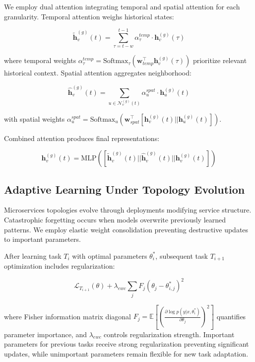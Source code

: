 We employ dual attention integrating temporal and spatial attention for each granularity. Temporal attention weighs historical states:

\begin{equation}
\tilde{\mathbf{h}}_v^{(g)}(t) = \sum_{\tau=t-w}^{t-1} \alpha_\tau^{temp} \cdot \mathbf{h}_v^{(g)}(\tau)
\end{equation}

where temporal weights $\alpha_\tau^{temp} = \text{Softmax}_\tau(\mathbf{w}_{temp}^\top \mathbf{h}_v^{(g)}(\tau))$ prioritize relevant historical context. Spatial attention aggregates neighborhood:

\begin{equation}
\hat{\mathbf{h}}_v^{(g)}(t) = \sum_{u \in \mathcal{N}_v^{(g)}(t)} \alpha_u^{spat} \cdot \mathbf{h}_u^{(g)}(t)
\end{equation}

with spatial weights $\alpha_u^{spat} = \text{Softmax}_u(\mathbf{w}_{spat}^\top [\mathbf{h}_v^{(g)}(t) || \mathbf{h}_u^{(g)}(t)])$.

Combined attention produces final representations:

\begin{equation}
\mathbf{h}_v^{(g)}(t) = \text{MLP}\left([\tilde{\mathbf{h}}_v^{(g)}(t) || \hat{\mathbf{h}}_v^{(g)}(t) || \mathbf{h}_v^{(g)}(t)]\right)
\end{equation}

\subsection{Adaptive Learning Under Topology Evolution}

Microservices topologies evolve through deployments modifying service structure. Catastrophic forgetting occurs when models overwrite previously learned patterns. We employ elastic weight consolidation preventing destructive updates to important parameters.

After learning task $T_i$ with optimal parameters $\theta_i^*$, subsequent task $T_{i+1}$ optimization includes regularization:

\begin{equation}
\mathcal{L}_{T_{i+1}}(\theta) + \lambda_{ewc} \sum_j F_j(\theta_j - \theta_{i,j}^*)^2
\end{equation}

where Fisher information matrix diagonal $F_j = \mathbb{E}[(\frac{\partial \log p(y|x,\theta_{i}^*)}{\partial \theta_j})^2]$ quantifies parameter importance, and $\lambda_{ewc}$ controls regularization strength. Important parameters for previous tasks receive strong regularization preventing significant updates, while unimportant parameters remain flexible for new task adaptation.

